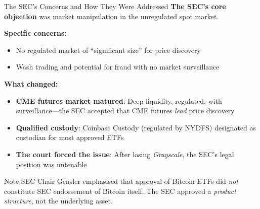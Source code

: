 \documentclass[10pt]{beamer}
\begin{document}
\begin{frame}{The SEC's Concerns and How They Were Addressed}
  \textbf{The SEC's core objection} was market manipulation in the unregulated spot market.
  
  \vspace{0.5em}
  \textbf{Specific concerns:}
  \begin{itemize}
    \item No regulated market of ``significant size'' for price discovery
    \item Wash trading and potential for fraud with no market surveillance
  \end{itemize}
  
  \vspace{0.5em}
  \textbf{What changed:}
  \begin{itemize}
    \item \textbf{CME futures market matured}: Deep liquidity, regulated, with surveillance---the SEC accepted that CME futures \textit{lead} price discovery
    \item \textbf{Qualified custody}: Coinbase Custody (regulated by NYDFS) designated as custodian for most approved ETFs
    \item \textbf{The court forced the issue}: After losing \textit{Grayscale}, the SEC's legal position was untenable
  \end{itemize}
  
  \vspace{0.3em}
  \begin{block}{Note}
    SEC Chair Gensler emphasised that approval of Bitcoin ETFs did \textit{not} constitute SEC endorsement of Bitcoin itself. The SEC approved a \textit{product structure}, not the underlying asset.
  \end{block}
\end{frame}
\end{document}
